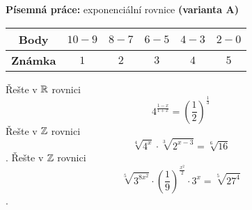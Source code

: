 \begin{center}
\large \textbf{Písemná práce:} exponenciální rovnice \textbf{(varianta A)}

\normalsize
{}\qquad
{}\qquad
{}
\end{center}
\begin{table}[h]
\centering
\begin{tabular}{c|c|c|c|c|c}
    \textbf{Body}   & $10-9$ & $8-7$ & $6-5$ & $4-3$ & $2-0$ \\ \hline
    \textbf{Známka} & $1$     & $2$   & $3 $  & $4$   & $5$
\end{tabular}
\end{table}

\begin{questions}
    \question[3] Řešte v $\mathbb{R}$ rovnici $$4^{\frac{1-x}{1+x}}=\left(\frac{1}{2}\right)^{\frac{1}{3}}$$
    \question[3] Řešte v $\mathbb{Z}$ rovnici $$\sqrt[4]{4^x}\cdot \sqrt[3]{2^{x-3}}=\sqrt[6]{16}$$.
    \question[4] Řešte v $\mathbb{Z}$ rovnici $$\sqrt[5]{3^{8x^2}}\cdot\left(\frac{1}{9}\right)^{\frac{x^2}{2}}\cdot 3^x=\sqrt[5]{27^4}$$.
\end{questions}

\newpage


